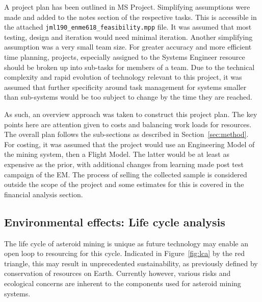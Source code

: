 \documentclass[conference]{IEEEtran}
\begin{document}
A project plan has been outlined in MS Project. Simplifying assumptions were made and added to the notes section of the respective tasks. This is accessible in the attached \verb|jml190_enme618_feasibility.mpp| file. It was assumed that most testing, design and iteration would need minimal iteration. Another simplifying assumption was a very small team size. For greater accuracy and more efficient time planning, projects, especially assigned to the Systems Engineer resource should be broken up into sub-tasks for members of a team. Due to the technical complexity and rapid evolution of technology relevant to this project, it was assumed that further specificity around task management for systems smaller than sub-systems would be too subject to change by the time they are reached. 

As such, an overview approach was taken to construct this project plan. The key points here are attention given to costs and balancing work loads for resources. The overall plan follows the sub-sections as described in Section~\ref{sec:method}. For costing, it was assumed that the project would use an Engineering Model of the mining system, then a Flight Model. The latter would be at least as expensive as the prior, with additional changes from learning made post test campaign of the EM. The process of selling the collected sample is considered outside the scope of the project and some estimates for this is covered in the financial analysis section.

\subsection{Environmental effects: Life cycle analysis}

The life cycle of asteroid mining is unique as future technology may enable an open loop to resourcing for this cycle. Indicated in Figure~\ref{fig:lca} by the red triangle, this may result in unprecedented sustainability, as previously defined by conservation of resources on Earth. Currently however, various risks and ecological concerns are inherent to the components used for asteroid mining systems.
\end{document}
